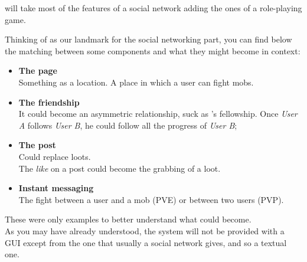		\SocialBattle{} will take most of the features of a social network adding the 
		ones of a role-playing game.

		Thinking of \Facebook{} as our landmark for the social networking part, 
		you can find below the matching between some \Facebook{} components and what 
		they might become in \SocialBattle{} context:
		\begin{itemize}
			\item \textbf{The page}\\
			Something as a location. A place in which a user can fight mobs.

			\item \textbf{The friendship}\\
			It could become an asymmetric relationship, suck as \Twitter{}'s fellowship.
			Once \textit{User A} follows \textit{User B}, he could follow all the progress
			of \textit{User B};

			\item \textbf{The post}\\
			Could replace loots.\\
			The \textit{like} on a post could become the grabbing of a loot.

			\item \textbf{Instant messaging}\\
			The fight between a user and a mob (PVE) or between two users (PVP).
		\end{itemize}

		These were only examples to better understand what \SocialBattle{} could become.\\
		As you may have already understood, the system will not be provided with a GUI except from the one 
		that usually a social network gives, and so a textual one.

